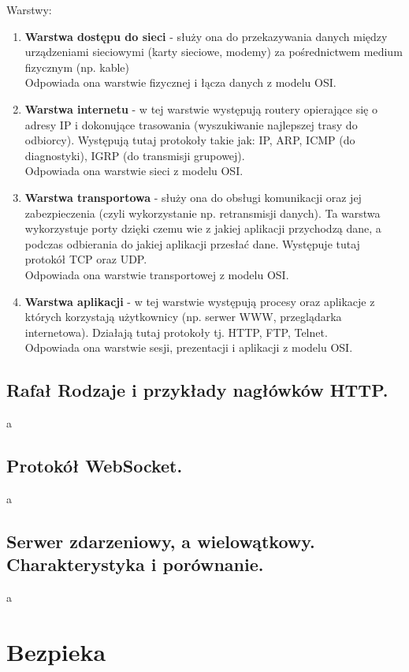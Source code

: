 \documentclass[a4paper,12pt,oneside]{book}
\begin{document}
			Warstwy:
			\begin{enumerate}
				\item \textbf{Warstwa dostępu do sieci} - służy ona do przekazywania danych między
				urządzeniami sieciowymi (karty sieciowe, modemy) za pośrednictwem medium
				fizycznym (np. kable)\\
				Odpowiada ona warstwie fizycznej i łącza danych z modelu OSI.
				\item \textbf{Warstwa internetu} - w tej warstwie występują routery opierające się o adresy IP i
				dokonujące trasowania (wyszukiwanie najlepszej trasy do odbiorcy).
				Występują tutaj protokoły takie jak: IP, ARP, ICMP (do diagnostyki), IGRP (do
				transmisji grupowej).\\
				Odpowiada ona warstwie sieci z modelu OSI.
				\item \textbf{Warstwa transportowa} - służy ona do obsługi komunikacji oraz jej zabezpieczenia
				(czyli wykorzystanie np. retransmisji danych). Ta warstwa wykorzystuje porty dzięki
				czemu wie z jakiej aplikacji przychodzą dane, a podczas odbierania do jakiej aplikacji
				przesłać dane. Występuje tutaj protokół TCP oraz UDP.\\
				Odpowiada ona warstwie transportowej z modelu OSI.
				\item \textbf{Warstwa aplikacji} - w tej warstwie występują procesy oraz aplikacje z których
				korzystają użytkownicy (np. serwer WWW, przeglądarka internetowa). Działają tutaj
				protokoły tj. HTTP, FTP, Telnet.\\
				Odpowiada ona warstwie sesji, prezentacji i aplikacji z modelu OSI.
			\end{enumerate}
			
			\newpage\subsection{\color{green} Rafał \color{red}Rodzaje i przykłady nagłówków HTTP.}
				a
			\newpage\subsection{\color{red}Protokół WebSocket.}
				a
			\newpage\subsection{\color{red}Serwer zdarzeniowy, a wielowątkowy. Charakterystyka i porównanie.}
				a
		
		\newpage\section{Bezpieka}
\end{document}

